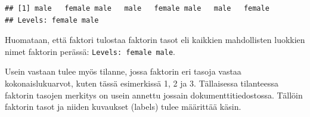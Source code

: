 \documentclass[
]{book}
\newenvironment{Shaded}{\begin{snugshade}}{\end{snugshade}}
\newcommand{\AttributeTok}[1]{\textcolor[rgb]{0.77,0.63,0.00}{#1}}
\newcommand{\CommentTok}[1]{\textcolor[rgb]{0.56,0.35,0.01}{\textit{#1}}}
\newcommand{\DecValTok}[1]{\textcolor[rgb]{0.00,0.00,0.81}{#1}}
\newcommand{\FunctionTok}[1]{\textcolor[rgb]{0.00,0.00,0.00}{#1}}
\newcommand{\NormalTok}[1]{#1}
\newcommand{\OtherTok}[1]{\textcolor[rgb]{0.56,0.35,0.01}{#1}}
\newcommand{\SpecialCharTok}[1]{\textcolor[rgb]{0.00,0.00,0.00}{#1}}
\newcommand{\StringTok}[1]{\textcolor[rgb]{0.31,0.60,0.02}{#1}}
\begin{document}
\begin{verbatim}
## [1] male   female male   male   female male   male   female
## Levels: female male
\end{verbatim}

Huomataan, että faktori tulostaa faktorin tasot eli kaikkien mahdollisten luokkien nimet faktorin perässä: \texttt{Levels:\ female\ male}.

Usein vastaan tulee myös tilanne, jossa faktorin eri tasoja vastaa kokonaislukuarvot, kuten tässä esimerkissä 1, 2 ja 3. Tällaisessa tilanteessa faktorin tasojen merkitys on usein annettu jossain dokumenttitiedostossa. Tällöin faktorin tasot ja niiden kuvaukset (labels) tulee määrittää käsin.

\begin{Shaded}
\end{Shaded}
\end{document}

